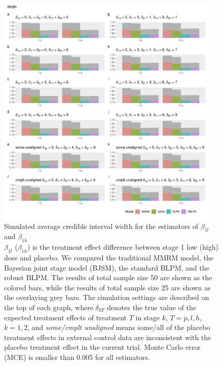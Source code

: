 \begin{figure}
\includegraphics[width=0.95\textwidth]{chapters/figures/Width_longitudinal.pdf}
\caption{Simulated average credible interval width for the estimators of $\beta_{1l}$ and $\beta_{1h}$\label{fig:Width_longitudinal}\\$\beta_{1l}$ ($\beta_{1h}$) is the treatment effect difference between stage 1 low (high) dose and placebo. We compared the traditional MMRM model, the Bayesian joint stage model (BJSM), the standard BLPM, and the robust BLPM. The results of total sample size 50 are shown as the colored bars, while the results of total sample size 25 are shown as the overlaying grey bars. The simulation settings are described on the top of each graph, where $\delta_{kT}$ denotes the true value of the expected treatment effects of treatment $T$ in stage $k$, $T = p, l, h$, $k = 1, 2$, and \emph{some/cmplt unaligned} means some/all of the placebo treatment effects in external control data are inconsistent with the placebo treatment effect in the current trial. Monte Carlo error (MCE) is smaller than 0.005 for all estimators.}
\end{figure}

